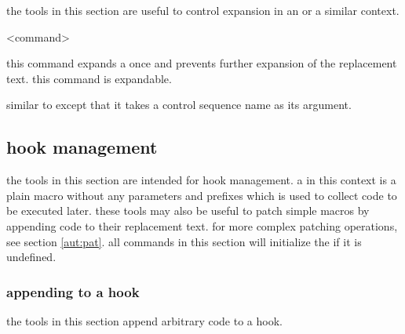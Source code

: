 the tools in this section are useful to control expansion in an  or a similar context.

\begin{ltxsyntax}

<command>

this command expands a  once and prevents further expansion of the replacement text. this command is expandable.


similar to  except that it takes a control sequence name as its argument.

\end{ltxsyntax}

\subsection{hook management}
\label{aut:hok}

the tools in this section are intended for hook management. a  in this context is a plain macro without any parameters and prefixes which is used to collect code to be executed later. these tools may also be useful to patch simple macros by appending code to their replacement text. for more complex patching operations, see section \ref{aut:pat}. all commands in this section will initialize the  if it is undefined.

\subsubsection{appending to a hook}
\label{aut:hok:app}

the tools in this section append arbitrary code to a hook.

